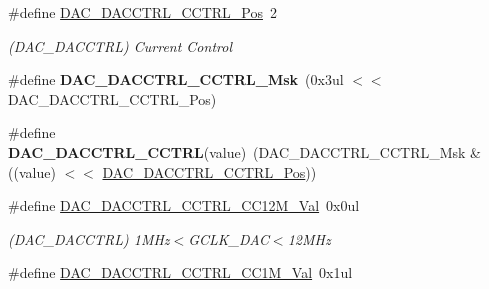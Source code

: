 \begin{DoxyCompactItemize}
\item 
\hypertarget{group___s_a_m_l21___d_a_c_ga99c14926d2b1e10dcdf3495435242fb2}{}\#define \hyperlink{group___s_a_m_l21___d_a_c_ga99c14926d2b1e10dcdf3495435242fb2}{D\+A\+C\+\_\+\+D\+A\+C\+C\+T\+R\+L\+\_\+\+C\+C\+T\+R\+L\+\_\+\+Pos}~2\label{group___s_a_m_l21___d_a_c_ga99c14926d2b1e10dcdf3495435242fb2}

\begin{DoxyCompactList}\small\item\em (D\+A\+C\+\_\+\+D\+A\+C\+C\+T\+R\+L) Current Control \end{DoxyCompactList}\item 
\hypertarget{group___s_a_m_l21___d_a_c_ga701f95bfdc7ec511991ee3f37c825f1e}{}\#define {\bfseries D\+A\+C\+\_\+\+D\+A\+C\+C\+T\+R\+L\+\_\+\+C\+C\+T\+R\+L\+\_\+\+Msk}~(0x3ul $<$$<$ D\+A\+C\+\_\+\+D\+A\+C\+C\+T\+R\+L\+\_\+\+C\+C\+T\+R\+L\+\_\+\+Pos)\label{group___s_a_m_l21___d_a_c_ga701f95bfdc7ec511991ee3f37c825f1e}

\item 
\hypertarget{group___s_a_m_l21___d_a_c_gadee5e56871ec428bb6b3ae5744ae0b2f}{}\#define {\bfseries D\+A\+C\+\_\+\+D\+A\+C\+C\+T\+R\+L\+\_\+\+C\+C\+T\+R\+L}(value)~(D\+A\+C\+\_\+\+D\+A\+C\+C\+T\+R\+L\+\_\+\+C\+C\+T\+R\+L\+\_\+\+Msk \& ((value) $<$$<$ \hyperlink{group___s_a_m_l21___d_a_c_ga99c14926d2b1e10dcdf3495435242fb2}{D\+A\+C\+\_\+\+D\+A\+C\+C\+T\+R\+L\+\_\+\+C\+C\+T\+R\+L\+\_\+\+Pos}))\label{group___s_a_m_l21___d_a_c_gadee5e56871ec428bb6b3ae5744ae0b2f}

\item 
\hypertarget{group___s_a_m_l21___d_a_c_ga47d57d2b4da612791e27d9e1a5574926}{}\#define \hyperlink{group___s_a_m_l21___d_a_c_ga47d57d2b4da612791e27d9e1a5574926}{D\+A\+C\+\_\+\+D\+A\+C\+C\+T\+R\+L\+\_\+\+C\+C\+T\+R\+L\+\_\+\+C\+C12\+M\+\_\+\+Val}~0x0ul\label{group___s_a_m_l21___d_a_c_ga47d57d2b4da612791e27d9e1a5574926}

\begin{DoxyCompactList}\small\item\em (D\+A\+C\+\_\+\+D\+A\+C\+C\+T\+R\+L) 1\+M\+Hz$<$G\+C\+L\+K\+\_\+\+D\+A\+C$<$12\+M\+Hz \end{DoxyCompactList}\item 
\hypertarget{group___s_a_m_l21___d_a_c_ga0eae47cb1607b2737281a3839708581f}{}\#define \hyperlink{group___s_a_m_l21___d_a_c_ga0eae47cb1607b2737281a3839708581f}{D\+A\+C\+\_\+\+D\+A\+C\+C\+T\+R\+L\+\_\+\+C\+C\+T\+R\+L\+\_\+\+C\+C1\+M\+\_\+\+Val}~0x1ul\label{group___s_a_m_l21___d_a_c_ga0eae47cb1607b2737281a3839708581f}


\end{DoxyCompactItemize}
